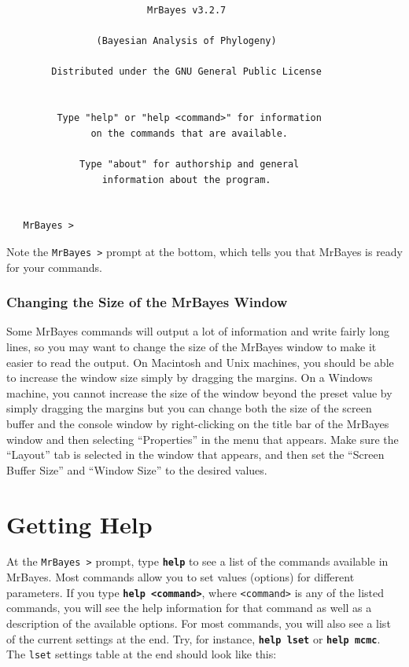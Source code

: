 \documentclass[12pt]{book}
\newcommand{\ttt}[1]{\texttt{#1}}
\newcommand{\tb}[1]{\ttt{\textbf{#1}}}
\begin{document}
\begin{singlespacing}
\footnotesize
\begin{verbatim}
                         MrBayes v3.2.7

                (Bayesian Analysis of Phylogeny)

        Distributed under the GNU General Public License


         Type "help" or "help <command>" for information
               on the commands that are available.

             Type "about" for authorship and general
                 information about the program.


   MrBayes >
\end{verbatim}
\normalsize
\end{singlespacing}

Note the \ttt{MrBayes >} prompt at the bottom, which tells you that MrBayes is ready for your
commands.

\subsubsection{Changing the Size of the MrBayes Window}

Some MrBayes commands will output a lot of information and write fairly long lines, so you may want
to change the size of the MrBayes window to make it easier to read the output. On Macintosh and
Unix machines, you should be able to increase the window size simply by dragging the margins. On a
Windows machine, you cannot increase the size of the window beyond the preset value by simply
dragging the margins but you can change both the size of the screen buffer and the console window
by right-clicking on the title bar of the MrBayes window and then selecting ``Properties'' in the
menu that appears. Make sure the ``Layout'' tab is selected in the window that appears, and then
set the ``Screen Buffer Size'' and ``Window Size'' to the desired values.

\section{Getting Help}
\label{gettingHelp}

At the \ttt{MrBayes >} prompt, type \tb{help} to see a list of the commands available in MrBayes.
Most commands allow you to set values (options) for different parameters. If you type \tb{help
<command>}, where \ttt{<command>} is any of the listed commands, you will see the help information
for that command as well as a description of the available options. For most commands, you will
also see a list of the current settings at the end. Try, for instance, \tb{help lset} or \tb{help
mcmc}. The \ttt{lset} settings table at the end should look like this:
\end{document}
